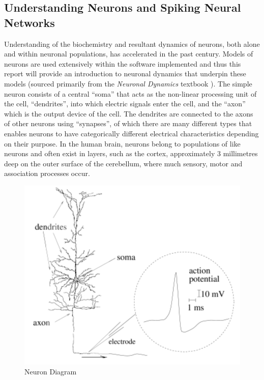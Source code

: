 \documentclass[11pt, twocolumn]{article}
\begin{document}
\subsection*{Understanding Neurons and Spiking Neural Networks}

Understanding of the biochemistry and resultant dynamics of neurons, both alone and within neuronal populations, has accelerated in the past century. Models of neurons are used extensively within the software implemented and thus this report will provide an introduction to neuronal dynamics that underpin these models (sourced primarily from the \textit{Neuronal Dynamics} textbook \cite{gerstner2014neuronal}). The simple neuron consists of a central ``soma'' that acts as the non-linear processing unit of the cell, ``dendrites'', into which electric signals enter the cell, and the ``axon'' which is the output device of the cell. The dendrites are connected to the axons of other neurons using ``synapses'', of which there are many different types that enables neurons to have categorically different electrical characteristics depending on their purpose. In the human brain, neurons belong to populations of like neurons and often exist in layers, such as the cortex, approximately 3 millimetres deep on the outer surface of the cerebellum, where much sensory, motor and association processes occur.

\begin{figure}[H]
	\centering
	\includegraphics[width=\linewidth]{neuron_diagram}
	\caption{Neuron Diagram \cite{gerstner2014neuronal}}
	\label{fig:neuron_diagram}
\end{figure}
\end{document}
